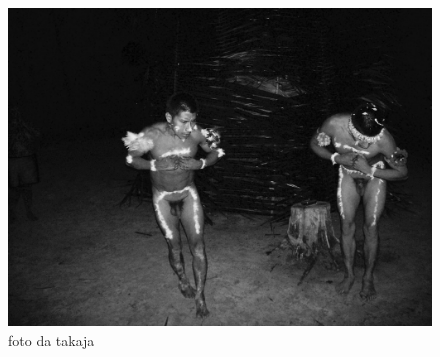 \begin{figure}[h]
\centering
  \includegraphics[width=\textwidth]{./imgs/100_1695}
\caption{foto da takaja}
\end{figure}

